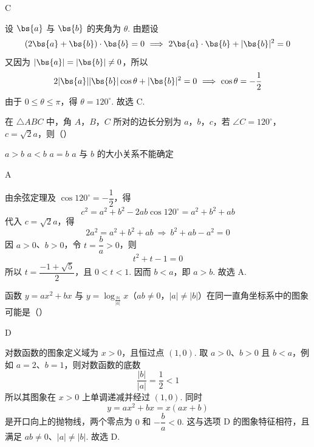 \begin{answer}
C
\end{answer}

\begin{solution}
设 \(\bs{a}\) 与 \(\bs{b}\) 的夹角为 \(\theta\). 由题设
\[
(2\bs{a}+\bs{b})\cdot\bs{b}=0
\ \Longrightarrow\ 2\bs{a}\cdot\bs{b}+|\bs{b}|^2=0
\]
又因为 \(|\bs{a}|=|\bs{b}|\ne0\)，所以
\[
2|\bs{a}||\bs{b}|\cos\theta+|\bs{b}|^2=0
\ \Longrightarrow\ \cos\theta=-\frac12
\]
由于 \(0\leqslant\theta\leqslant\pi\)，得 \(\theta=120^\circ\). 故选 C.
\end{solution}

\begin{problem}
在 \(\triangle ABC\) 中，角 \(A\)，\(B\)，\(C\) 所对的边长分别为 \(a\)，\(b\)，\(c\)，若 \(\angle C = 120^{\circ}\)，\(c = \sqrt{2} a\)，则（\quad）

\choices
    {\(a > b\)}
    {\(a < b\)}
    {\(a = b\)}
    {\(a\) 与 \(b\) 的大小关系不能确定}
\end{problem}

\begin{answer}
A
\end{answer}

\begin{solution}
由余弦定理及 \(\cos120^\circ=-\dfrac12\)，得
\[
c^2=a^2+b^2-2ab\cos120^\circ=a^2+b^2+ab
\]
代入 \(c=\sqrt2a\)，得
\[
2a^2=a^2+b^2+ab
\ \Longrightarrow\ b^2+ab-a^2=0
\]
因 \(a>0\)、\(b>0\)，令 \(t=\dfrac ba>0\)，则
\[
t^2+t-1=0
\]
所以 \(t=\dfrac{-1+\sqrt5}{2}\)，且 \(0<t<1\). 因而 \(b<a\)，即 \(a>b\). 故选 A.
\end{solution}

\begin{problem}
函数 \( y = ax^2 + bx \) 与 \( y = \log_{\frac{|b|}{|a|}} x \)（\(ab \neq 0\)，\(|a| \neq |b|\)）在同一直角坐标系中的图象可能是（\quad）

    {}
    {}
    {}
\end{problem}

\begin{answer}
D
\end{answer}

\begin{solution}
对数函数的图象定义域为 \(x>0\)，且恒过点 \((1,0)\). 取 \(a>0\)、\(b>0\) 且 \(b<a\)，例如 \(a=2\)、\(b=1\)，则对数函数的底数
\[
\frac{|b|}{|a|}=\frac12<1
\]
所以其图象在 \(x>0\) 上单调递减并经过 \((1,0)\). 同时
\[
y=ax^2+bx=x(ax+b)
\]
是开口向上的抛物线，两个零点为 \(0\) 和 \(-\dfrac ba<0\). 这与选项 D 的图象特征相符，且满足 \(ab\ne0\)、\(|a|\ne|b|\). 故选 D.
\end{solution}

